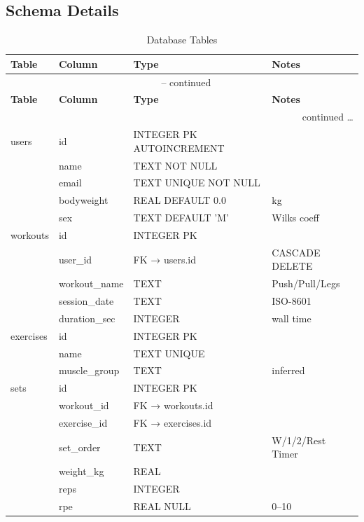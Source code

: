 \documentclass[12pt,a4paper]{report}
\begin{document}
\subsection{Schema Details}

\begin{longtable}{llll}
\caption{Database Tables} \\
\toprule
\textbf{Table} & \textbf{Column} & \textbf{Type} & \textbf{Notes} \\
\midrule
\endfirsthead
\multicolumn{4}{c}{\tablename\ \thetable{} -- continued} \\
\toprule
\textbf{Table} & \textbf{Column} & \textbf{Type} & \textbf{Notes} \\
\midrule
\endhead
\midrule
\multicolumn{4}{r}{continued \ldots} \\
\endfoot
\bottomrule
\endlastfoot
users      & id          & INTEGER PK AUTOINCREMENT & \\
           & name        & TEXT NOT NULL & \\
           & email       & TEXT UNIQUE NOT NULL & \\
           & bodyweight  & REAL DEFAULT 0.0 & kg \\
           & sex         & TEXT DEFAULT 'M' & Wilks coeff \\
\midrule
workouts   & id          & INTEGER PK & \\
           & user\_id    & FK → users.id & CASCADE DELETE \\
           & workout\_name & TEXT & Push/Pull/Legs \\
           & session\_date & TEXT & ISO-8601 \\
           & duration\_sec & INTEGER & wall time \\
\midrule
exercises  & id          & INTEGER PK & \\
           & name        & TEXT UNIQUE & \\
           & muscle\_group & TEXT & inferred \\
\midrule
sets       & id          & INTEGER PK & \\
           & workout\_id & FK → workouts.id & \\
           & exercise\_id & FK → exercises.id & \\
           & set\_order  & TEXT & W/1/2/Rest Timer \\
           & weight\_kg  & REAL & \\
           & reps        & INTEGER & \\
           & rpe         & REAL NULL & 0--10 \\

\end{longtable}
\end{document}
